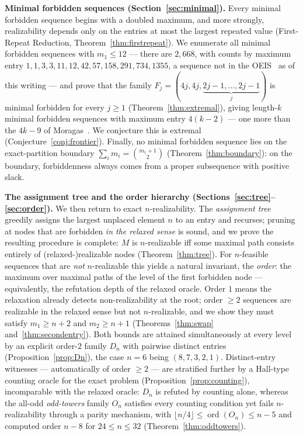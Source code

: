\documentclass[11pt]{article}
\theoremstyle{definition}
\theoremstyle{remark}
\newcommand{\ord}{\operatorname{ord}}
\begin{document}
\textbf{Minimal forbidden sequences (Section~\ref{sec:minimal}).}
Every minimal forbidden sequence begins with a doubled maximum, and more strongly,
realizability depends only on the entries at most the largest repeated value
(First-Repeat Reduction, Theorem~\ref{thm:firstrepeat}). We enumerate all minimal
forbidden sequences with $m_1\le 12$ --- there are $2{,}668$, with counts by maximum
entry $1,1,3,3,11,12,42,57,158,291,734,1355$, a sequence not in the
OEIS~\cite{OEIS} as of this writing --- and prove that the family
$F_j=(4j,4j,\underbrace{2j-1,\dots,2j-1}_{j})$ is minimal forbidden for every $j\ge1$
(Theorem~\ref{thm:extremal}), giving length-$k$ minimal forbidden sequences with
maximum entry $4(k-2)$ --- one more than the $4k-9$ of
Moragas~\cite{Moragas10}. We conjecture this is extremal
(Conjecture~\ref{conj:frontier}). Finally, no minimal forbidden sequence lies on the
exact-partition boundary $\sum_im_i=\binom{m_1+1}{2}$
(Theorem~\ref{thm:boundary}): on the boundary, forbiddenness always comes from a
proper subsequence with positive slack.

\textbf{The assignment tree and the order hierarchy
(Sections~\ref{sec:tree}--\ref{sec:order}).}
We then return to exact $n$-realizability. The \emph{assignment tree} greedily assigns
the largest unplaced element $n$ to an entry and recurses; pruning at nodes that are
forbidden \emph{in the relaxed sense} is sound, and we prove the resulting procedure
is complete: $M$ is $n$-realizable iff some maximal path consists entirely of
(relaxed-)realizable nodes (Theorem~\ref{thm:tree}). For $n$-feasible sequences that
are \emph{not} $n$-realizable this yields a natural invariant, the \emph{order}: the
maximum over maximal paths of the level of the first forbidden node --- equivalently,
the refutation depth of the relaxed oracle. Order $1$ means the relaxation already
detects non-realizability at the root; order $\ge2$ sequences are realizable in the
relaxed sense but not $n$-realizable, and we show they must satisfy $m_1\ge n+2$ and
$m_2\ge n+1$ (Theorems~\ref{thm:swap} and~\ref{thm:secondentry}). Both bounds are
attained simultaneously at every level by an explicit order-$2$ family $D_n$ with
pairwise distinct entries (Proposition~\ref{prop:Dn}), the case $n=6$ being
$(8,7,3,2,1)$. Distinct-entry witnesses --- automatically of order $\ge2$ --- are
stratified further by a Hall-type counting oracle for the exact problem
(Proposition~\ref{prop:counting}), incomparable with the relaxed oracle: $D_n$ is
refuted by counting alone, whereas the all-odd \emph{odd-towers} family $O_n$
satisfies every counting condition yet fails $n$-realizability through a parity
mechanism, with $\lfloor n/4\rfloor\le\ord(O_n)\le n-5$ and computed order $n-8$
for $24\le n\le32$ (Theorem~\ref{thm:oddtowers}).
\end{document}
